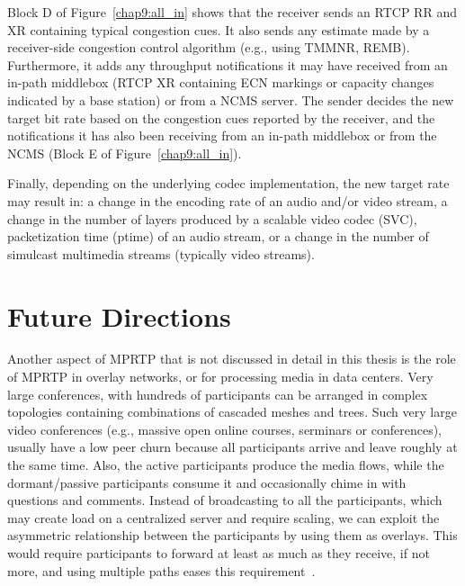 Block D of Figure~\ref{chap9:all_in} shows that the receiver sends an RTCP
RR and XR containing typical congestion cues. It also sends any estimate made
by a receiver-side congestion control algorithm (e.g., using TMMNR, REMB).
Furthermore, it adds any throughput notifications it may have received from an
in-path middlebox (RTCP XR containing ECN markings or capacity changes
indicated by a base station) or from a NCMS server. The sender decides the new
target bit rate based on the congestion cues reported by the receiver, and the
notifications it has also been receiving from an in-path middlebox or from the
NCMS (Block E of Figure~\ref{chap9:all_in}).


Finally, depending on the underlying codec implementation, the new target rate
may result in: a change in the encoding rate of an audio and/or video stream,
a change in the number of layers produced by a scalable video codec (SVC),
packetization time (ptime) of an audio stream, or a change in the number of
simulcast multimedia streams (typically video streams).

\section{Future Directions}

Another aspect of MPRTP that is not discussed in detail in this thesis is the
role of MPRTP in overlay networks, or for processing media in data centers. Very
large conferences, with hundreds of participants can be arranged in complex
topologies containing combinations of cascaded meshes and trees. Such very
large video conferences (e.g., massive open online courses, serminars or
conferences), usually have a low peer churn because all participants arrive
and leave roughly at the same time. Also, the active participants produce the
media flows, while the dormant/passive participants consume it and occasionally
chime in with questions and comments. Instead of broadcasting to all the
participants, which may create load on a centralized server and require
scaling, we can exploit the asymmetric relationship between the participants
by using them as overlays. This would require participants to forward at least
as much as they receive, if not more, and using multiple paths eases this
requirement~\cite{Noh2008,Li2010a,Globisch:AsymGrpComm}.



